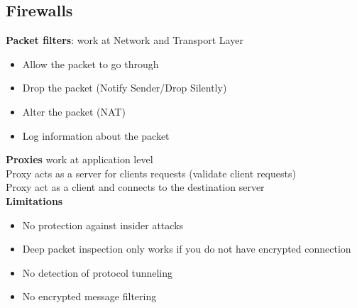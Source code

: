 \documentclass[10pt,a4paper]{book}
\begin{document}
\subsection{Firewalls}
\textbf{Packet filters}: work at Network and Transport Layer
\begin{itemize}
\item Allow the packet to go through
\item Drop the packet (Notify Sender/Drop Silently)
\item Alter the packet (NAT)
\item Log information about the packet
\end{itemize}
\textbf{Proxies} work at application level\\
Proxy acts as a server for clients requests (validate client requests)\\
Proxy act as a client and connects to the destination server\\
\textbf{Limitations}
\begin{itemize}
\item No protection against insider attacks
\item Deep packet inspection only works if you do not have encrypted connection
\item No detection of protocol tunneling
\item No encrypted message filtering
\end{itemize}
\end{document}
